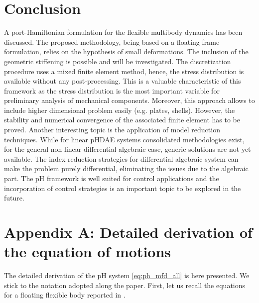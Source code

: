 \documentclass{svjour3}                     %
\begin{document}
\section{Conclusion}
A port-Hamiltonian formulation for the flexible multibody dynamics has been discussed. The proposed methodology, being based on a floating frame formulation, relies on the hypothesis of small deformations. The inclusion of the geometric stiffening is possible and will be investigated. The discretization procedure uses a mixed finite element method, hence, the stress distribution is available without any post-processing. This is a valuable characteristic of this framework as the stress distribution is the most important variable for preliminary analysis of mechanical components. Moreover, this approach allows to include higher dimensional problem easily (e.g. plates, shells). However, the stability and numerical convergence of the associated finite element has to be proved. Another interesting topic is the application of model reduction techniques. While for linear pHDAE systems consolidated methodologies exist, for the general non linear differential-algebraic case, generic solutions are not yet available. The index reduction strategies for differential algebraic system can make the problem purely differential, eliminating the issues due to the algebraic part.  The pH framework is well suited for control applications and the incorporation of control strategies is an important topic to be explored in the future.



\section*{Appendix A: Detailed derivation of the equation of motions}

The detailed derivation of the pH system \eqref{eq:ph_mfd_all} is here presented. We stick to the notation adopted along the paper. First, let us recall the equations for a floating flexible body reported in \cite{MB_Daepde,simeon2013computational}.
\end{document}
